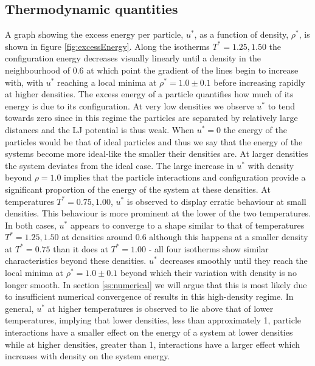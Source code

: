 \documentclass[10pt, twocolumn]{revtex4}    %
\begin{document}
\subsection{Thermodynamic quantities} \label{ss:thermodynamics}
A graph showing the excess energy per particle, $u^{*}$, as a function of density, $\rho{}^{*}$, is shown in figure \ref{fig:excessEnergy}. Along the isotherms $T^{*} = 1.25, 1.50$ the configuration energy decreases visually linearly until a density in the neighbourhood of \num{0.6} at which point the gradient of the lines begin to increase with, with $u^{*}$ reaching a local minima at $\rho^{*}=1.0\pm{}0.1$ before increasing rapidly at higher densities. The excess energy of a particle quantifies how much of its energy is due to its configuration. At very low densities we observe $u^{*}$ to tend towards zero since in this regime the particles are separated by relatively large distances and the LJ potential is thus weak. When $u^{*}=0$ the energy of the particles would be that of ideal particles and thus we say that the energy of the systems become more ideal-like the smaller their densities are. At larger densities the system deviates from the ideal case. The large increase in $u^{*}$ with density beyond $\rho{}=1.0$ implies that the particle interactions and configuration provide a significant proportion of the energy of the system at these densities.
At temperatures $T^{*}=0.75, 1.00$, $u^{*}$ is observed to display erratic behaviour at small densities. This behaviour is more prominent at the lower of the two temperatures. In both cases, $u^{*}$ appears to converge to a shape similar to that of temperatures $T^{*}=1.25, 1.50$ at densities around \num{0.6} although this happens at a smaller density at $T^{*}=0.75$ than it does at $T^{*}=1.00$ - all four isotherms show similar characteristics beyond these densities. $u^{*}$ decreases smoothly until they reach the local minima at $\rho^{*}=1.0\pm{}0.1$ beyond which their variation with density is no longer smooth. In section \ref{ss:numerical} we will argue that this is most likely due to insufficient numerical convergence of results in this high-density regime.
In general, $u^{*}$ at higher temperatures is observed to lie above that of lower temperatures, implying that lower densities, less than approximately \num{1}, particle interactions have a smaller effect on the energy of a system at lower densities while at higher densities, greater than \num{1}, interactions have a larger effect which increases with density on the system energy.
\end{document}
